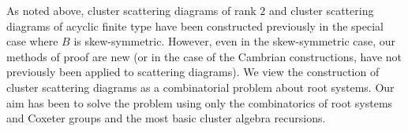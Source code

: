 \documentclass[ALCO,ThmDefs,Unicode,epreuves]{cedram}
\newcommand{\g}{\mathbf{g}}
\begin{document}
As noted above, cluster scattering diagrams of rank $2$ and cluster scattering diagrams of acyclic finite type have been constructed previously in the special case where $B$ is skew-symmetric.
However, even in the skew-symmetric case, our methods of proof are new (or in the case of the Cambrian constructions, have not previously been applied to scattering diagrams). 
We view the construction of cluster scattering diagrams as a combinatorial problem about root systems.
Our aim has been to solve the problem using only the combinatorics of root systems and Coxeter groups and the most basic cluster algebra recursions.
%
%
%
%
%
\end{document}
